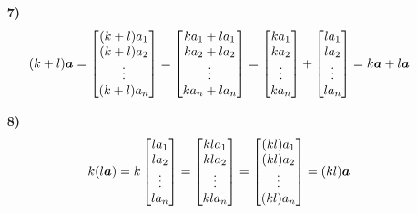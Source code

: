 \begin{problem}
\begin{solution}
\begin{enumerate}
			\item[\textbf{7)}]
			$$
			\begin{aligned}
				(k + l) \boldsymbol{a}
				& = \begin{bmatrix} (k + l) a_1 \\ (k + l) a_2 \\ \vdots \\ (k + l) a_n \end{bmatrix}
				= \begin{bmatrix} k a_1 + l a_1 \\ k a_2 + l a_2 \\ \vdots \\ k a_n + l a_n \end{bmatrix}
				= \begin{bmatrix} k a_1 \\ k a_2 \\ \vdots \\ k a_n \end{bmatrix}
				+ \begin{bmatrix} l a_1 \\ l a_2 \\ \vdots \\ l a_n \end{bmatrix}
				= k \boldsymbol{a} + l \boldsymbol{a}
			\end{aligned}
			$$

			\item[\textbf{8)}]
			$$
			\begin{aligned}
				k (l \boldsymbol{a})
				& = k \begin{bmatrix} l a_1 \\ l a_2 \\ \vdots \\ l a_n \end{bmatrix}
				= \begin{bmatrix} k l a_1 \\ k l a_2 \\ \vdots \\ k l a_n \end{bmatrix}
				= \begin{bmatrix} (k l) a_1 \\ (k l) a_2 \\ \vdots \\ (k l) a_n \end{bmatrix}
				= (k l) \boldsymbol{a}
			\end{aligned}
			$$


\end{enumerate}
\end{solution}
\end{problem}
